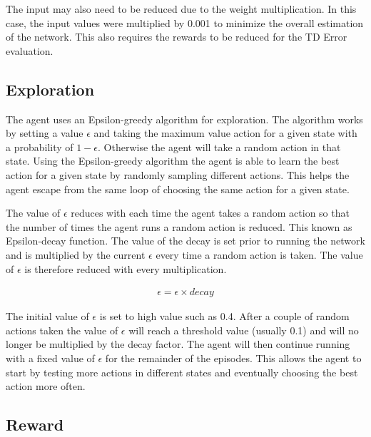 The input may also need to be reduced due to the weight multiplication. In this
case, the input values were multiplied by 0.001 to minimize the overall
estimation of the network. This also requires the rewards to be reduced for the
TD Error evaluation.

\subsection{Exploration}
The agent uses an Epsilon-greedy algorithm for exploration. The algorithm works
by setting a value $\epsilon$ and taking the maximum value action for a given
state with a probability of $1-\epsilon$. Otherwise the agent will take a random
action in that state. Using the Epsilon-greedy algorithm the agent is able to
learn the best action for a given state by randomly sampling different actions.
This helps the agent escape from the same loop of choosing the same action for a
given state.

The value of $\epsilon$ reduces with each time the agent takes a random action
so that the number of times the agent runs a random action is reduced. This
known as Epsilon-decay function. The value of the decay is set prior to running
the network and is multiplied by the current $\epsilon$ every time a random
action is taken. The value of $\epsilon$ is therefore reduced with every
multiplication.

\begin{align}
    \epsilon = \epsilon \times decay
\end{align}

The initial value of $\epsilon$ is set to high value such as 0.4. After a couple
of random actions taken the value of $\epsilon$ will reach a threshold value
(usually 0.1) and will no longer be multiplied by the decay factor. The agent
will then continue running with a fixed value of $\epsilon$ for the remainder of
the episodes. This allows the agent to start by testing more actions in
different states and eventually choosing the best action more often.

\subsection{Reward}

